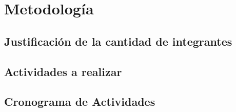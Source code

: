 
\chapter{Metodología} %

\label{ch:metodologia} %
\section{Justificación de la cantidad de integrantes}
\section{Actividades a realizar}
\section{Cronograma de Actividades}

